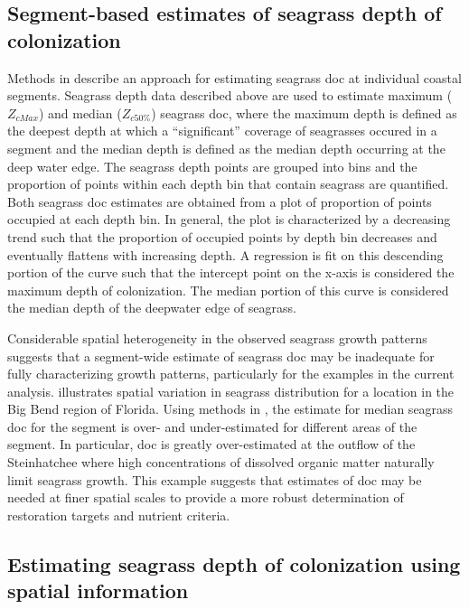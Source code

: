 \documentclass[letterpaper,12pt,oneside]{article}\usepackage[]{graphicx}\usepackage[]{color}
\begin{document}
\subsection{Segment-based estimates of seagrass depth of colonization}

Methods in  describe an approach for estimating seagrass \ac{doc} at individual coastal segments.  Seagrass depth data described above are used to estimate maximum ($Z_{cMax}$) and median ($Z_{c50\%}$) seagrass \ac{doc}, where the maximum depth is defined as the deepest depth at which a ``significant'' coverage of seagrasses occured in a segment and the median depth is defined as the median depth occurring at the deep water edge. The seagrass depth points are grouped into bins and the proportion of points within each depth bin that contain seagrass are quantified.  Both seagrass \ac{doc} estimates are obtained from a plot of proportion of points occupied at each depth bin.  In general, the plot is characterized by a decreasing trend such that the proportion of occupied points by depth bin decreases and eventually flattens with increasing depth.  A regression is fit on this descending portion of the curve such that the intercept point on the x-axis is considered the maximum depth of colonization.  The median portion of this curve is considered the median depth of the deepwater edge of seagrass.   

Considerable spatial heterogeneity in the observed seagrass growth patterns suggests that a segment-wide estimate of seagrass \ac{doc} may be inadequate for fully characterizing growth patterns, particularly for the examples in the current analysis.  illustrates spatial variation in seagrass distribution  for a location in the Big Bend region of Florida.  Using methods in , the estimate for median seagrass \ac{doc} for the segment is over- and under-estimated for different areas of the segment.  In particular, \ac{doc} is greatly over-estimated at the outflow of the Steinhatchee where high concentrations of dissolved organic matter naturally limit seagrass growth.  This example suggests that estimates of \ac{doc} may be needed at finer spatial scales to provide a more robust determination of restoration targets and nutrient criteria.

\subsection{Estimating seagrass depth of colonization using spatial information}
\end{document}
